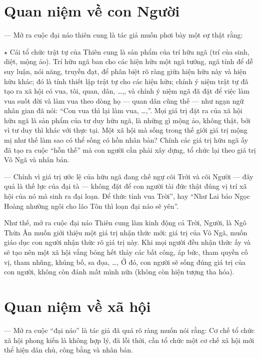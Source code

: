 
\section{Quan niệm về con Người} %
\label{sec:4_con_nguoi}

— Mở ra cuộc đại náo thiên cung là tác giả muốn phơi bày một sự thật rằng:

$\star$ Cái tổ chức trật tự của Thiên cung là sản phẩm của trí hữu ngã (trí của sinh, diệt, mộng ảo). Trí hữu ngã ban cho các hiện hữu một ngã tướng, ngã tính để dễ suy luận, nói năng, truyền đạt, để phân biệt rõ ràng giữa hiện hữu này và hiện hữu khác; đó là tính thiết lập trật tự cho các hiện hữu; chính ý niệm trật tự đã tạo ra xã hội có vua, tôi, quan, dân, \ldots,, và chính ý niệm ngã đã đặt để việc làm vua suốt đời và làm vua theo dòng họ — quan dân cũng thế — như ngạn ngữ nhân gian đã nói: ``Con vua thì lại làm vua, \ldots,''. Mọi giá trị đặt ra của xã hội hữu ngã là sản phẩm của tư duy hữu ngã, là những gì mộng ảo, không thật, bởi vì tư duy thì khác với thực tại. Một xã hội mà sống trong thế giới giá trị mộng mị như thế làm sao có thể sống có hồn nhân bản? Chính các giá trị hữu ngã ấy đã tạo ra cuộc ``hỗn thế'' mà con người cần phải xây dựng, tổ chức lại theo giá trị Vô Ngã và nhân bản.

— Chính vì giá trị ước lệ của hữu ngã đang chế ngự cõi Trời và cõi Người — đây quả là thế lực của đại tà — không đặt để con người tài đức thật đúng vị trí xã hội của nó mà sinh ra đại loạn. Để thức tỉnh vua Trời'', hay ``Như Lai bảo Ngọc Hoàng nhường ngôi cho lão Tôn thì loạn đại náo sẽ yên''.

Như thế, mở ra cuộc đại náo Thiên cung làm kinh động cả Trời, Người, là Ngô Thừa Ân muốn giới thiệu một giá trị nhận thức mới: giá trị của Vô Ngã, muốn giáo dục con người nhận thức rõ giá trị này. Khi mọi người đều nhận thức ấy và sẽ tạo nên một xã hội vắng bóng hết thảy các bất công, áp bức, tham quyền cố vị, tham nhũng, khủng bố, sa đọa, \ldots, Ở đó, con người sẽ sống đúng giá trị của con người, không còn đánh mất mình nữa (không còn hiện tượng tha hóa).


\section{Quan niệm về xã hội} %
\label{sec:4_xa_hoi}

— Mở ra cuộc ``đại náo'' là tác giả đã quá rõ ràng muốn nói rằng: Cơ chế tổ chức xã hội phong kiến là không hợp lý, đã lỗi thời, cần tổ chức một cơ chế xã hội mới thể hiện dân chủ, công bằng và nhân bản.

